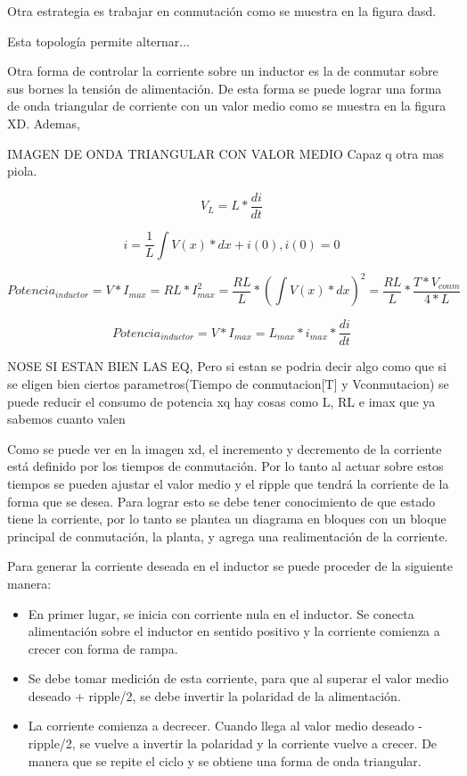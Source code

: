 Otra estrategia es trabajar en conmutación como se muestra en la figura dasd.

Esta topología permite alternar...

Otra forma de controlar la corriente sobre un inductor es la de conmutar sobre sus bornes la tensión de alimentación. De esta forma se puede lograr una forma de onda triangular de corriente con un valor medio como se muestra en la figura XD. Ademas,

IMAGEN DE ONDA TRIANGULAR CON VALOR MEDIO Capaz q otra mas piola.


\begin{equation}
V_{L} =L*\frac{di}{dt}
\end{equation}

\begin{equation}
i =\frac{1}{L}\int{V(x)*dx}+i(0) , i(0)=0
\end{equation}

\begin{equation}
Potencia_{inductor} = V*I_{max}=RL*I_{max}^2=\frac{RL}{L}*(\int{V(x)*dx})^2=\frac{RL}{L}*\frac{T*V_{conm}}{4*L}
\end{equation}

\begin{equation}
Potencia_{inductor} = V*I_{max}=L_{max}*i_{max}*\frac{di}{dt}
\end{equation}

NOSE SI ESTAN BIEN LAS EQ, Pero si estan se podria decir algo como que si se eligen bien ciertos parametros(Tiempo de conmutacion[T] y Vconmutacion) se puede reducir el consumo de potencia xq hay cosas como L, RL e imax que ya sabemos cuanto valen

Como se puede ver en la imagen xd, el incremento y decremento de la corriente está definido por los tiempos de conmutación. Por lo tanto al actuar sobre estos tiempos se pueden ajustar el valor medio y el ripple que tendrá la corriente de la forma que se desea. Para lograr esto se debe tener conocimiento de que estado tiene la corriente, por lo tanto se plantea un diagrama en bloques con un bloque principal de conmutación, la planta, y agrega una realimentación de la corriente.



Para generar la corriente deseada en el inductor se puede proceder de la siguiente manera:

\begin{itemize}
\item En primer lugar, se inicia con corriente nula en el inductor. Se conecta alimentación sobre el inductor en sentido positivo y la corriente comienza a crecer con forma de rampa.
\item Se debe tomar medición de esta corriente, para que al superar el valor medio deseado + ripple/2, se debe invertir la polaridad de la alimentación.
\item La corriente comienza a decrecer. Cuando llega al valor medio deseado - ripple/2, se vuelve a invertir la polaridad y la corriente vuelve a crecer. De manera que se repite el ciclo y se obtiene una forma de onda triangular.
\end{itemize}

